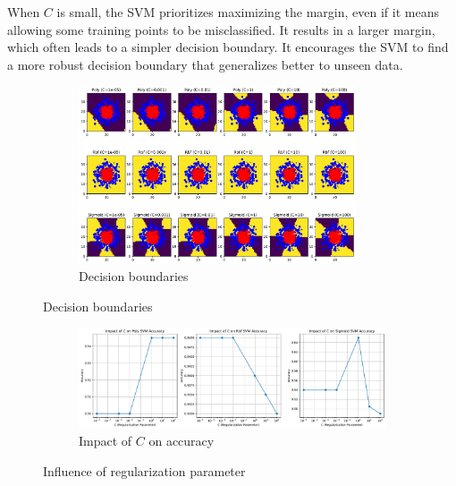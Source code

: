 When $C$ is small, the SVM prioritizes maximizing the margin, even if it means allowing some training points to be misclassified. It results in a larger margin, which often leads to a simpler decision boundary. It encourages the SVM to find a more robust decision boundary that generalizes better to unseen data.

\begin{figure}[H]
    \centering
    \begin{subfigure}{\textwidth}
        \centering
        \includegraphics[width=0.9\textwidth]{figs/NN/svm_regularization_grid.pdf}
        \caption{Decision boundaries}
        \label{subfig:svm_regularization_grid}
    \end{subfigure}
\end{figure}

\begin{figure}[H]\ContinuedFloat
    \centering
    \begin{subfigure}{0.9\textwidth}
        \centering
        \includegraphics[width=\textwidth]{figs/NN/svm_regularization_acc.pdf}
        \caption{Impact of $C$ on accuracy}
        \label{subfig:svm_regularization_acc}
    \end{subfigure}
    \caption{Influence of regularization parameter}
    \label{fig:svm_regularization}
\end{figure}
